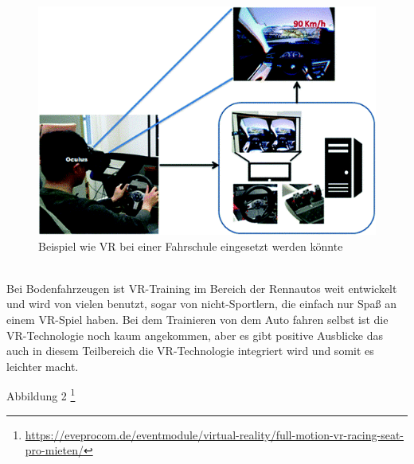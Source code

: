 \\
\begin{figure}[!ht]
    \centering
    \includegraphics[width=1.0\textwidth]{images/Abbildung 3.png}
    \caption{\label{fig:Abbildung 3}Beispiel wie VR bei einer Fahrschule eingesetzt werden könnte\cite{ihemedu2017virtual}\protect
    }
\end{figure}
\\
Bei Bodenfahrzeugen ist VR-Training im Bereich der Rennautos weit entwickelt und wird von vielen benutzt, sogar von nicht-Sportlern, die einfach nur Spaß an einem VR-Spiel haben. Bei dem Trainieren von dem Auto fahren selbst ist die VR-Technologie noch kaum angekommen, aber es gibt positive Ausblicke das auch in diesem Teilbereich die VR-Technologie integriert wird und somit es leichter macht.

Abbildung 2 \footnote{\url{https://eveprocom.de/eventmodule/virtual-reality/full-motion-vr-racing-seat-pro-mieten/}}

